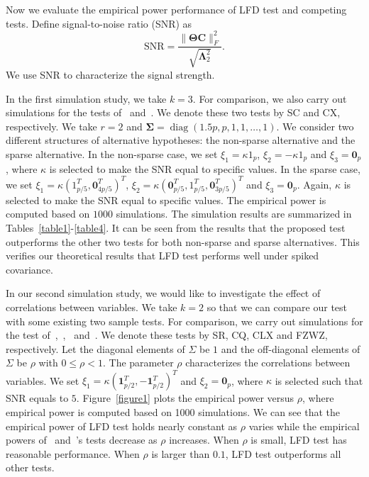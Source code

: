 \documentclass[12pt]{article} %
\DeclareMathOperator{\mydiag}{diag}
\newcommand{\bC}{\mathbf{C}}
\newcommand{\bfsym}[1]{\ensuremath{\boldsymbol{#1}}}
\def\bLambda {\bfsym {\Lambda}}
\def\bSigma {\bfsym {\Sigma}}
\def\bTheta {\bfsym {\Theta}}
\theoremstyle{definition}
\begin{document}
   
   
   



Now we evaluate the empirical power performance of LFD test and competing tests.
Define signal-to-noise ratio (SNR) as
$$
\textrm{SNR}=\frac{\|\bTheta\bC\|_F^2}{\sqrt{\bLambda_2^2}}.
$$
We use SNR to characterize the signal strength.

In the first simulation study, we take $k=3$.
For comparison, we also carry out simulations for the tests of~\citet{Schott2007Some} and~\citet{Cai2014High}.
We denote these two tests by  SC and  CX, respectively.
We take $r=2$ and $\bSigma=\mydiag(1.5p,p,1,1,\ldots,1)$.
We consider two different structures of alternative hypotheses: the non-sparse alternative and the sparse alternative.
In the non-sparse case, we set $\xi_1=\kappa 1_p$, $\xi_2=-\kappa 1_p$ and $\xi_3=\mathbf{0}_p$, where $\kappa$ is selected to make the SNR equal to specific values.
In the sparse case, we set $\xi_1=\kappa (1_{p/5}^T,\mathbf{0}_{4p/5}^T)^T$, $\xi_2=\kappa (\mathbf{0}_{p/5}^T, 1_{p/5}^T,\mathbf{0}_{3p/5}^T)^T$ and $\xi_3=\mathbf{0}_p$.
Again, $\kappa$ is selected to make the SNR equal to specific values.
The empirical power is computed based on $1000$ simulations.
The simulation results are summarized in Tables~\ref{table1}-\ref{table4}. It can be seen from the results that the proposed test outperforms the other two tests for both non-sparse and sparse alternatives.
This verifies our theoretical results that LFD test performs well under spiked covariance.

In our second simulation study, we would like to investigate the effect of correlations between variables.
We take $k=2$ so that we can compare our test with some existing two sample tests.
For comparison, we carry out simulations for the test of~\cite{Srivastava2007Multivariate},~\cite{Chen2010A},~\cite{Tony2013} and~\cite{Feng2014Two}.
We denote these tests by SR, CQ, CLX and FZWZ, respectively.
Let the diagonal elements of $\Sigma$ be $1$ and the off-diagonal elements of $\Sigma$ be $\rho$ with $0\leq \rho<1$.
The parameter $\rho$ characterizes the correlations between variables.
We set $\xi_1=\kappa (\textbf{1}_{p/2}^T,-\textbf{1}_{p/2}^T)^T$ and $\xi_2=\mathbf{0}_p$, where $\kappa$ is selected such that SNR equals to $5$.
Figure~\ref{figure1} plots the empirical power versus $\rho$, where empirical power is computed based on 1000 simulations.
We can see that the empirical power of LFD test holds nearly constant as $\rho$ varies while the empirical powers of~\cite{Chen2010A} and~\cite{Feng2014Two}'s tests decrease as $\rho$ increases.
When $\rho$ is small,  LFD test has reasonable performance. When $\rho$ is larger than $0.1$, LFD test outperforms all other tests.
\end{document}
